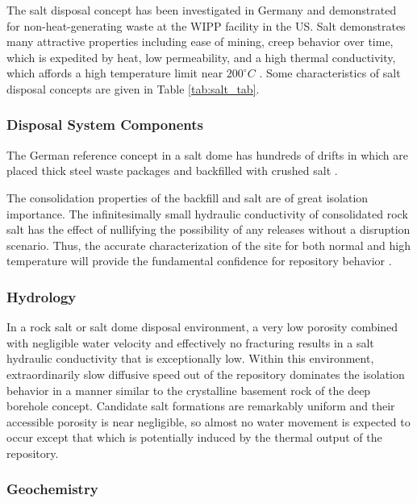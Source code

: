 The salt disposal concept has been investigated in Germany and demonstrated for 
non-heat-generating waste at the \gls{WIPP} facility in the US. Salt 
demonstrates many attractive properties including ease of mining, creep behavior 
over time, which is expedited by heat, low permeability, and a high thermal 
conductivity, which affords a high temperature limit near $200^{\circ}C$ 
\cite{hardin_generic_2011} .
Some characteristics of salt disposal 
concepts are given in Table \ref{tab:salt_tab}.   



\subsubsection{Disposal System Components}

The German reference concept in a salt dome has hundreds of drifts in which 
are placed thick steel waste packages and backfilled with crushed salt 
\cite{von_lensa_red-impact_2008}. 

The consolidation properties of the backfill and salt are of great isolation 
importance. The infinitesimally small hydraulic conductivity of consolidated 
rock salt has the effect of nullifying the possibility of any releases without 
a disruption scenario. Thus, the accurate characterization of the site for both 
normal and high temperature will provide the fundamental confidence for 
repository behavior \cite{brewitz_long-term_2002}.


\subsubsection{Hydrology}

In a rock salt or salt dome disposal environment, a very low porosity combined 
with negligible water velocity and effectively no fracturing results in a 
salt hydraulic conductivity that is exceptionally low. Within this environment,   
extraordinarily slow diffusive speed out of the repository dominates the 
isolation behavior in a manner similar to the crystalline basement rock of the deep 
borehole concept. Candidate salt formations are remarkably uniform and their 
accessible porosity is near negligible, so almost no water movement is expected to 
occur except that which is potentially induced by the thermal output of the 
repository.

\subsubsection{Geochemistry}

